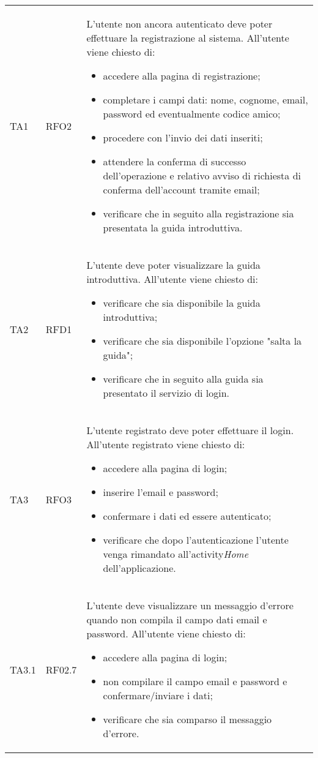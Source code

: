 \begin{longtable}{ >{\centering}p{} >{\centering}p{} >{\centering}p{}
			}
		TA1	& RFO2 &	L'utente non ancora autenticato deve poter effettuare la registrazione al sistema. All'utente viene chiesto di:
		\begin{itemize}
			\item accedere alla pagina di registrazione;
			\item completare i campi dati: nome, cognome, email, password ed eventualmente codice amico;
			\item procedere con l'invio dei dati inseriti;
			\item attendere la conferma di successo dell'operazione e relativo avviso di richiesta di conferma dell'account tramite email;
			\item verificare che in seguito alla registrazione sia presentata la guida introduttiva.
		\end{itemize}		\tabularnewline
		TA2	& RFD1 &	L'utente deve poter visualizzare la guida introduttiva. All'utente viene chiesto di:
		 \begin{itemize}
		 	\item verificare che sia disponibile la guida introduttiva;
		 	\item verificare che sia disponibile l'opzione "salta la guida";
		 	\item verificare che in seguito alla guida sia presentato il servizio di login. 
		 \end{itemize}		\tabularnewline
		 TA3	& RFO3 & L'utente registrato deve poter effettuare il login. All'utente registrato viene chiesto di:
		 \begin{itemize}
		 	\item accedere alla pagina di login;
		 	\item inserire l'email e password;
		 	\item confermare i dati ed essere autenticato;
		 	\item verificare che dopo l'autenticazione l'utente venga rimandato all'activity\glosp \textit{Home} dell'applicazione.
		 \end{itemize}		\tabularnewline
		 TA3.1 & RF02.7	& L'utente deve visualizzare un messaggio d'errore quando non compila il campo dati email e password. All'utente viene chiesto di:
		 \begin{itemize}
		 	\item accedere alla pagina di login;
		 	\item non compilare il campo email e password e confermare/inviare i dati;
		 	\item verificare che sia comparso il messaggio d'errore.

\end{itemize}
\end{longtable}
